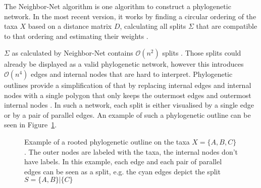 The Neighbor-Net algorithm \cite{bryantNeighborNetAgglomerativeMethod2004} is
one algorithm to construct a phylogenetic network. In the most recent version,
it works by finding a circular ordering of the taxa $X$ based on a distance matrix
$D$, calculating all splits $\Sigma$ that are compatible to that ordering and
estimating their weights \cite{bryantNeighborNetImprovedAlgorithms2023}. 

$\Sigma$ as calculated by Neighbor-Net contains $\mathcal{O}(n^2)$ splits
\cite{bryantNeighborNetImprovedAlgorithms2023}. Those splits could already be
displayed as a valid phylogenetic network, however this introduces
$\mathcal{O}(n^4)$ edges and internal nodes
\cite{bagciMicrobialPhylogeneticContext2021} that are hard to interpret.
Phylogenetic outlines provide a simplification of that by replacing internal
edges and internal nodes with a single polygon that only keeps the outermost
edges and outermost internal nodes \cite{bagciMicrobialPhylogeneticContext2021}.
In such a network, each split is either visualised by a single edge or by a pair
of parallel edges. An example of such a phylogenetic outline can be seen in
Figure~\ref{fig:outlineExample}. 

\begin{figure}
  \centering
  \caption{Example of a rooted phylogenetic outline on the taxa $X = \{A, B,
  C\}$. The outer nodes are labeled with the taxa, the internal nodes don't have
  labels. In this example, each edge and each pair of parallel edges can be seen
  as a split, e.g. the cyan edges depict the split $S = \{A, B\} | \{C\}$}
  \label{fig:outlineExample}
\end{figure}

